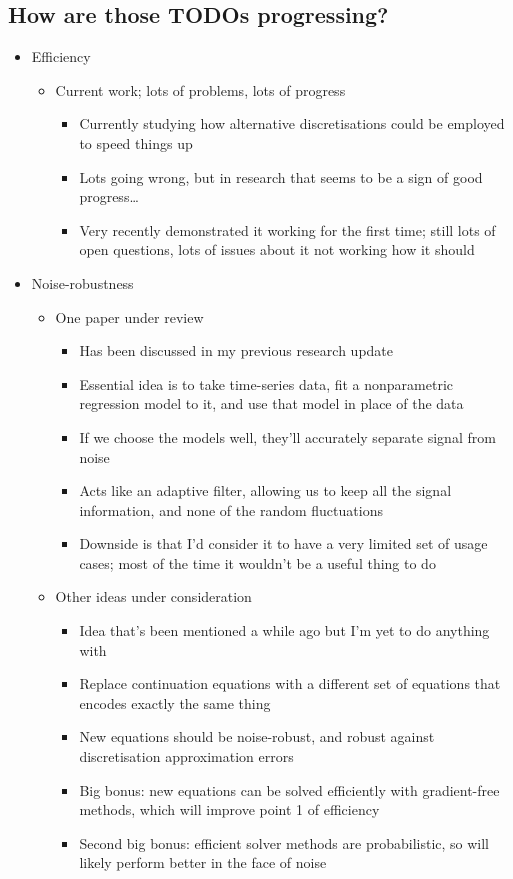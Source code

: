 \documentclass[11pt]{article}
\begin{document}
\subsection{How are those TODOs progressing?}
\label{sec:org03f83a2}
\begin{itemize}
\item Efficiency
\begin{itemize}
\item Current work; lots of problems, lots of progress
\begin{itemize}
\item Currently studying how alternative discretisations could be employed to speed things up
\item Lots going wrong, but in research that seems to be a sign of good progress\ldots{}
\item Very recently demonstrated it working for the first time; still lots of open questions, lots of issues about it not working how it should
\end{itemize}
\end{itemize}

\item Noise-robustness
\begin{itemize}
\item One paper under review
\begin{itemize}
\item Has been discussed in my previous research update
\item Essential idea is to take time-series data, fit a nonparametric regression model to it, and use that model in place of the data
\item If we choose the models well, they'll accurately separate signal from noise
\item Acts like an adaptive filter, allowing us to keep all the signal information, and none of the random fluctuations
\item Downside is that I'd consider it to have a very limited set of usage cases; most of the time it wouldn't be a useful thing to do
\end{itemize}
\item Other ideas under consideration
\begin{itemize}
\item Idea that's been mentioned a while ago but I'm yet to do anything with
\item Replace continuation equations with a different set of equations that encodes exactly the same thing
\item New equations should be noise-robust, and robust against discretisation approximation errors
\item Big bonus: new equations can be solved efficiently with gradient-free methods, which will improve point 1 of efficiency
\item Second big bonus: efficient solver methods are probabilistic, so will likely perform better in the face of noise
\end{itemize}
\end{itemize}


\end{itemize}
\end{document}
